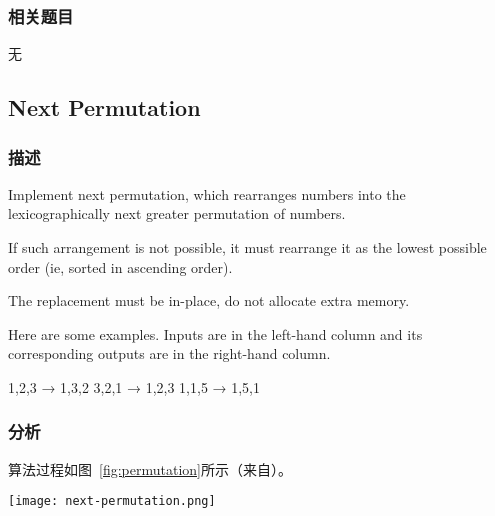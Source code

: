 \subsubsection{相关题目}
\begindot
\item 无
\myenddot


\subsection{Next Permutation} %
\label{sec:next-permutation}


\subsubsection{描述}
Implement next permutation, which rearranges numbers into the lexicographically next greater permutation of numbers.

If such arrangement is not possible, it must rearrange it as the lowest possible order (ie, sorted in ascending order).

The replacement must be in-place, do not allocate extra memory.

Here are some examples. Inputs are in the left-hand column and its corresponding outputs are in the right-hand column.
\begin{Code}
1,2,3 → 1,3,2
3,2,1 → 1,2,3
1,1,5 → 1,5,1
\end{Code}


\subsubsection{分析}
算法过程如图~\ref{fig:permutation}所示（来自）。

\begin{center}
\texttt{[image: next-permutation.png]}\\
\label{fig:permutation}
\end{center}


